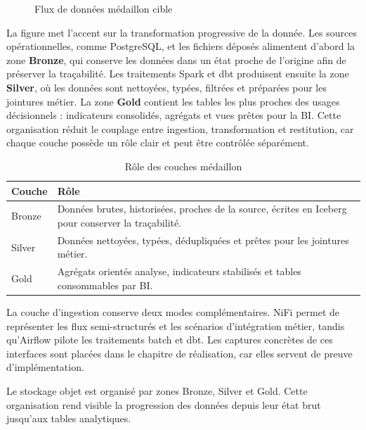 \begin{figure}[H]
\centering
{}
\caption{Flux de données médaillon cible}
\label{fig:flux-medallion}
\end{figure}

La figure met l'accent sur la transformation progressive de la donnée. Les sources opérationnelles, comme PostgreSQL, et les fichiers déposés alimentent d'abord la zone \textbf{Bronze}, qui conserve les données dans un état proche de l'origine afin de préserver la traçabilité. Les traitements Spark et dbt produisent ensuite la zone \textbf{Silver}, où les données sont nettoyées, typées, filtrées et préparées pour les jointures métier. La zone \textbf{Gold} contient les tables les plus proches des usages décisionnels : indicateurs consolidés, agrégats et vues prêtes pour la BI. Cette organisation réduit le couplage entre ingestion, transformation et restitution, car chaque couche possède un rôle clair et peut être contrôlée séparément.

\clearpage

\begin{table}[H]
\centering
\caption{Rôle des couches médaillon}
\label{tab:medallion}
\small
\begin{tabular}{@{}p{}p{}@{}}
\toprule
\textbf{Couche} & \textbf{Rôle} \\
\midrule
Bronze & Données brutes, historisées, proches de la source, écrites en Iceberg pour conserver la traçabilité. \\
Silver & Données nettoyées, typées, dédupliquées et prêtes pour les jointures métier. \\
Gold & Agrégats orientés analyse, indicateurs stabilisés et tables consommables par BI. \\
\bottomrule
\end{tabular}
\end{table}

La couche d'ingestion conserve deux modes complémentaires. NiFi permet de représenter les flux semi-structurés et les scénarios d'intégration métier, tandis qu'Airflow pilote les traitements batch et dbt. Les captures concrètes de ces interfaces sont placées dans le chapitre de réalisation, car elles servent de preuve d'implémentation.

Le stockage objet est organisé par zones Bronze, Silver et Gold. Cette organisation rend visible la progression des données depuis leur état brut jusqu'aux tables analytiques.

